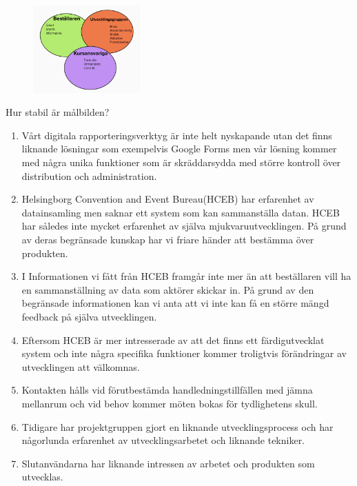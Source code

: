 \documentclass{article}
\begin{document}
\begin{figure}[htp]
    \centering
    \includegraphics[width = 155px]{malbild.jpg}
    \label{fig:24}
\end{figure}

Hur stabil är målbilden?

\begin{enumerate}
	\item Vårt digitala rapporteringsverktyg är inte helt nyskapande utan det finns liknande
lösningar som exempelvis Google Forms men vår lösning kommer med några unika
funktioner som är skräddarsydda med större kontroll över distribution och
administration. 

	 \item Helsingborg Convention and Event Bureau(HCEB) har erfarenhet av datainsamling
men saknar ett system som kan sammanställa datan. HCEB har således inte
mycket erfarenhet av själva mjukvaruutvecklingen. På grund av deras begränsade kunskap har vi friare händer att bestämma över produkten.

\item I Informationen vi fått från HCEB framgår inte mer än att beställaren vill ha en sammanställning av data som aktörer skickar in. På grund av den begränsade informationen kan vi anta att vi inte kan få en större mängd feedback på själva utvecklingen.

\item Eftersom HCEB är mer intresserade av att det finns ett färdigutvecklat system och
inte några specifika funktioner kommer troligtvis förändringar av utvecklingen att
välkomnas.

\item Kontakten hålls vid förutbestämda handledningstillfällen med jämna mellanrum och
vid behov kommer möten bokas för tydlighetens skull.

\item Tidigare har projektgruppen gjort en liknande utvecklingsprocess och har någorlunda
erfarenhet av utvecklingsarbetet och liknande tekniker.

\item Slutanvändarna har liknande intressen av arbetet och produkten som utvecklas.
\end{enumerate}
\end{document}
